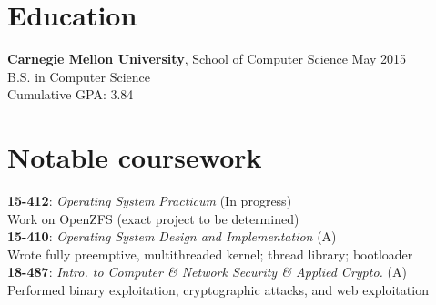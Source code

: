 \documentclass[margin]{res}
\newcommand{\course}[4]{ %
    \textbf{#1}: \textit{#2} (#4)\\
      #3
      \vspace{1em}
    \\}
\begin{document}

\address{
  5032 Forbes Avenue SMC 6899 \\
  Pittsburgh, PA 15289-6899 \\
  (302) 468-7537
}
\address{  %
  \hfill \href{mailto:joshz@joshz.org}{joshz@joshz.org} \\
  \hfill
    \href{https://github.com/joshzimmerman}{https://github.com/joshzimmerman} \\
  \hfill \href{http://joshz.org}{http://joshz.org}
}

\begin{resume}

\section{Education}
  \textbf{Carnegie Mellon University}, School of Computer Science
    \hfill May 2015\\
  B.S. in Computer Science\\
  Cumulative GPA: 3.84

\section{Notable coursework}
 \course{15-412}{Operating System Practicum}{Work on OpenZFS (exact project to be determined)}{In progress}
 \course{15-410}{Operating System Design and Implementation}
 {Wrote fully preemptive, multithreaded kernel; thread library; bootloader}{A}
  \course{18-487}{Intro. to Computer \& Network Security \& Applied Crypto.}
 {Performed binary exploitation, cryptographic attacks, and web exploitation}{A}
      \vspace{-2em}



\end{resume}
\end{document}
